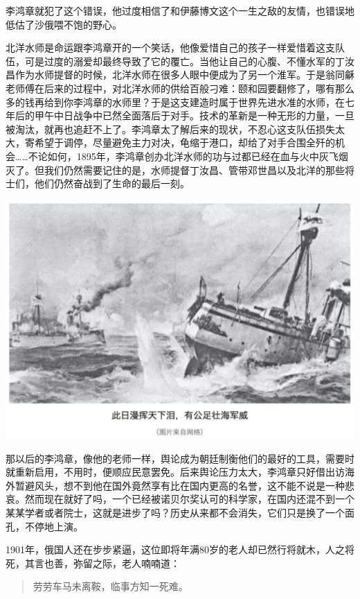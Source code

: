 \documentclass[]{book}
\begin{document}
李鸿章就犯了这个错误，他过度相信了和伊藤博文这个一生之敌的友情，也错误地低估了沙俄喂不饱的野心。

北洋水师是命运跟李鸿章开的一个笑话，他像爱惜自己的孩子一样爱惜着这支队伍，可是过度的溺爱却最终导致了它的覆亡。当他让自己的心腹、不懂水军的丁汝昌作为水师提督的时候，北洋水师在很多人眼中便成为了另一个淮军。于是翁同龢老师傅在后来的过程中，对北洋水师的供给百般刁难：颐和园要翻修了，哪有那么多的钱再给到你李鸿章的水师里？于是这支建造时属于世界先进水准的水师，在七年后的甲午中日战争中已然全面落后于对手。技术的革新是一种无形的力量，一旦被淘汰，就再也追赶不上了。李鸿章太了解后来的现状，不忍心这支队伍损失太大，寄希望于调停，尽量避免主力对决，龟缩于港口，却给了对手合围全歼的机会\ldots{}\ldots{}不论如何，1895年，李鸿章创办北洋水师的功与过都已经在血与火中灰飞烟灭了。但我们仍然需要记住的是，水师提督丁汝昌、管带邓世昌以及北洋的那些将士们，他们仍然奋战到了生命的最后一刻。

\includegraphics[width=6.67in]{images/his4}

那以后的李鸿章，像他的老师一样，舆论成为朝廷制衡他们的最好的工具，需要时就重新启用，不用时，便顺应民意罢免。后来舆论压力太大，李鸿章只好借出访海外暂避风头，想不到他在国外竟然享有比在国内更高的名誉，这不能不说是一种悲哀。然而现在就好了吗，一个已经被诺贝尔奖认可的科学家，在国内还混不到一个某某学者或者院士，这就是进步了吗？历史从来都不会消失，它们只是换了一个面孔，不停地上演。

1901年，俄国人还在步步紧逼，这位即将年满80岁的老人却已然行将就木，人之将死，其言也善，弥留之际，老人喃喃道：

\begin{quote}
劳劳车马未离鞍，临事方知一死难。
\end{quote}
\end{document}
